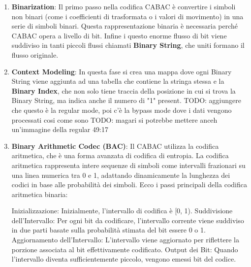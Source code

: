 \documentclass[a4paper,12pt, oneside]{article}
\begin{document}
\begin{enumerate}
    \item \textbf{Binarization}: Il primo passo nella codifica CABAC è convertire i simboli
    non binari (come i coefficienti di trasformata o i valori di movimento) in una serie di simboli binari.
    Questa rappresentazione binaria è necessaria perché CABAC opera a livello di bit. Infine i questo enorme
    flusso di bit viene suddiviso in tanti piccoli flussi chiamati \textbf{Binary String}, che uniti formano
    il flusso originale.
    
    \item \textbf{Context Modeling}: In questa fase si crea una mappa dove ogni Binary String viene
    aggiunta ad una tabella che contiene la stringa stessa e la \textbf{Binary Index}, che non solo
    tiene traccia della posizione in cui si trova la Binary String, ma indica anche il numero di "1"
    present.
    TODO: aggiungere che questo è la regular mode, poi c'è la bypass mode dove i dati vengono processati cosi come sono
    TODO: magari si potrebbe mettere anceh un'immagine della regular  49:17
    
    \item \textbf{Binary Arithmetic Codec (BAC)}: Il CABAC utilizza la codifica aritmetica, che è una forma avanzata di codifica di entropia. La codifica aritmetica rappresenta intere sequenze di simboli come intervalli frazionari su una linea numerica tra 0 e 1, adattando dinamicamente la lunghezza dei codici in base alle probabilità dei simboli. Ecco i passi principali della codifica aritmetica binaria:
    
    Inizializzazione: Inizialmente, l'intervallo di codifica è [0, 1).
    Suddivisione dell'Intervallo: Per ogni bit da codificare, l'intervallo corrente viene suddiviso in due parti basate sulla probabilità stimata del bit essere 0 o 1.
    Aggiornamento dell'Intervallo: L'intervallo viene aggiornato per riflettere la porzione associata al bit effettivamente codificato.
    Output dei Bit: Quando l'intervallo diventa sufficientemente piccolo, vengono emessi bit del codice.
\end{enumerate}
\end{document}
